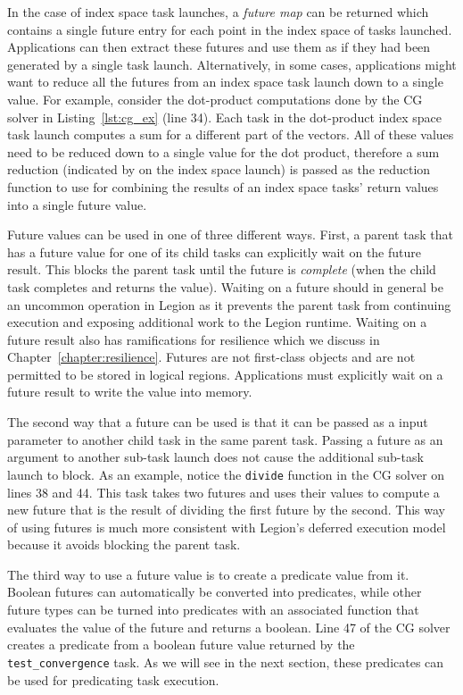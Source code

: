 In the case of index space task launches,
a {\em future map} can be returned which 
contains a single future entry for each point
in the index space of tasks launched. Applications
can then extract these futures and use them
as if they had been generated by a single task
launch. Alternatively, in some cases, applications
might want to reduce all the futures from an 
index space task launch down to a single value.
For example, consider the dot-product computations
done by the CG solver in Listing~\ref{lst:cg_ex}
(line 34). Each task in the dot-product index
space task launch computes a sum for a different
part of the vectors. All of these values need to 
be reduced down to a single value for the dot product,
therefore a sum reduction (indicated by {\tt <+>} on the
index space launch) is passed as the reduction function to 
use for  combining the results of an index space
tasks' return values into a single future value.

Future values can be used in one of three
different ways. First, a parent task that
has a future value for one of its child tasks
can explicitly wait on the future result. This
blocks the parent task until the future is 
{\em complete} (when the child task completes
and returns the value). Waiting on a future
should in general be an uncommon operation in
Legion as it prevents the parent task from
continuing execution and exposing additional
work to the Legion runtime.
Waiting on a future result also has ramifications
for resilience which we discuss in 
Chapter~\ref{chapter:resilience}. Futures are not 
first-class objects and are not permitted to be 
stored in logical regions. Applications must 
explicitly wait on a future result
to write the value into memory.

The second way that a future can be used is that
it can be passed as a input parameter to another
child task in the same parent task. Passing a future
as an argument to another sub-task launch does
not cause the additional sub-task launch to
block. As an example, notice the {\tt divide}
function in the CG solver on lines 38 and 44. This
task takes two futures and uses their values to 
compute a new future that is the result of dividing
the first future by the second. This way of using 
futures is much more consistent with Legion's 
deferred execution model because it avoids
blocking the parent task. 

The third way to use a future value is to create
a predicate value from it. Boolean futures can
automatically be converted into predicates,
while other future types can be turned into
predicates with an associated function that
evaluates the value of the future and 
returns a boolean. Line 47 of the CG solver
creates a predicate from a boolean future
value returned by the {\tt test\_convergence}
task. As we will see in the next section,
these predicates can be used for predicating
task execution.

